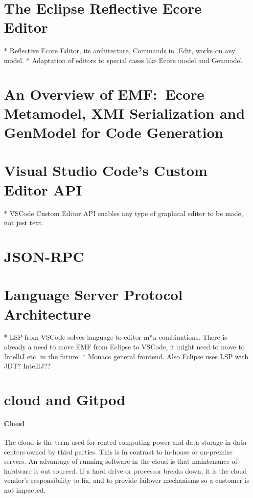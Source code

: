 \section{The Eclipse Reflective Ecore Editor}

* Reflective Ecore Editor, its architecture, Commands in .Edit, works on any model.
* Adaptation of editors to special cases like Ecore model and Genmodel.

\section{An Overview of EMF:\ Ecore Metamodel, XMI Serialization and GenModel for Code Generation}\label{sec:emf-metamodel}




\section{Visual Studio Code's Custom Editor API}\label{sec:vscode-custom-editor}
* VSCode Custom Editor API enables any type of graphical editor to be made, not just text.

\section{JSON-RPC}

\section{Language Server Protocol Architecture}\label{sec:lsp}
* LSP from VSCode solves language-to-editor m*n combinations. There is already a need to move EMF from Eclipse to VSCode, it might need to move to IntelliJ etc. in the future.
* Monaco general frontend. Also Eclipse uses LSP with JDT? IntelliJ??


\section{\Gls{cloud} and \gls{Gitpod}}

\paragraph{Cloud}
The \gls{cloud} is the term used for rented computing power and data storage in data centers owned by third parties.
This is in contrast to in-house or on-premise servers.
An advantage of running software in the \gls{cloud} is that maintenance of hardware is out sourced.
If a hard drive or processor breaks down, it is the cloud vendor's responsibility to fix, and to provide failover mechanisms so a customer is not impacted.


